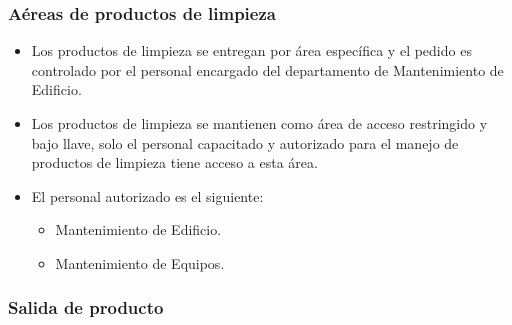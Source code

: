 \subsubsection{Aéreas de productos de limpieza}

\begin{itemize}
	\item Los productos de limpieza se entregan por área específica y el pedido es controlado por el personal encargado del departamento de Mantenimiento de Edificio.
	\item Los productos de limpieza se mantienen como área de acceso restringido y bajo llave, solo el personal capacitado y autorizado para el manejo de productos de limpieza tiene acceso a esta área.
	\item El personal autorizado es el siguiente:
	\begin{itemize}
		\item Mantenimiento de Edificio.
		\item Mantenimiento de Equipos.
	\end{itemize}
\end{itemize}

\subsubsection{Salida de producto}

